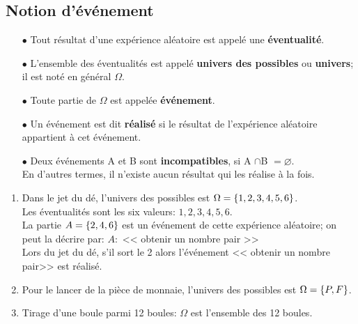 \subsection*{Notion d'événement}
\begin{definition}
\begin{itemize}

\item[$  \bullet$]
Tout résultat d'une expérience aléatoire est appelé une \textbf{ éventualité}. 
\item [$  \bullet$] L'ensemble des éventualités est appelé \textbf{univers des possibles} ou \textbf{univers}; il est noté en général $ \Omega $. 
\item[$  \bullet$] Toute partie de $ \Omega $ est appelée \textbf{ événement}.
\item[$  \bullet$] Un événement est dit \textbf{réalisé} si le résultat de l'expérience aléatoire appartient à cet événement.
\item[$  \bullet$] Deux événements A et B  sont \textbf{  incompatibles},  si A $ \cap $B $ = \varnothing$.\\ En d'autres termes, il n'existe aucun résultat qui les réalise à la fois.
\end{itemize}
\end{definition}

\begin{example}
\begin{enumerate}
\item Dans le jet du dé, l'univers des possibles est $ \Omega =\left\{1,2,3,4,5,6\right\} $.\\ 
Les éventualités sont  les six valeurs: $ 1,2,3,4,5,6 $.\\
 La partie $ A=\left\{2,4,6\right\} $ est un événement de cette expérience aléatoire; on peut la décrire par: $ A :$  <<  obtenir  un nombre pair  >>\\
 Lors du jet du dé, s'il sort  le 2 alors l'événement <<  obtenir  un nombre pair>>  est réalisé.
  \item Pour le lancer de la pièce de monnaie, l'univers des possibles est $ \Omega =\left\{P,F\right\} $.
  \item   Tirage d'une boule parmi 12 boules: $ \Omega$  est l'ensemble des 12 boules.
\end{enumerate}
\end{example}


\bigskip

